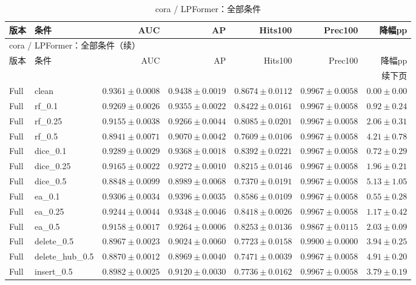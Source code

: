 \documentclass[UTF8,a4paper,11pt,fontset=fandol]{ctexart}
\begin{document}
{\footnotesize
\setlength{\tabcolsep}{3pt}
\begin{longtable}{llrrrrr}
\caption{cora / LPFormer：全部条件}\\
\toprule
版本 & 条件 & AUC & AP & Hits100 & Prec100 & 降幅pp \\
\midrule
\endfirsthead
\multicolumn{7}{l}{cora / LPFormer：全部条件（续）}\\
\toprule
版本 & 条件 & AUC & AP & Hits100 & Prec100 & 降幅pp \\
\midrule
\endhead
\midrule\multicolumn{7}{r}{续下页}\\
\endfoot
\bottomrule\endlastfoot
Full & clean & $0.9361\pm0.0008$ & $0.9438\pm0.0019$ & $0.8674\pm0.0112$ & $0.9967\pm0.0058$ & $0.00\pm0.00$ \\
Full & rf\_0.1 & $0.9269\pm0.0026$ & $0.9355\pm0.0022$ & $0.8422\pm0.0161$ & $0.9967\pm0.0058$ & $0.92\pm0.24$ \\
Full & rf\_0.25 & $0.9155\pm0.0038$ & $0.9266\pm0.0044$ & $0.8085\pm0.0201$ & $0.9967\pm0.0058$ & $2.06\pm0.31$ \\
Full & rf\_0.5 & $0.8941\pm0.0071$ & $0.9070\pm0.0042$ & $0.7609\pm0.0106$ & $0.9967\pm0.0058$ & $4.21\pm0.78$ \\
Full & dice\_0.1 & $0.9289\pm0.0029$ & $0.9368\pm0.0018$ & $0.8392\pm0.0221$ & $0.9967\pm0.0058$ & $0.72\pm0.29$ \\
Full & dice\_0.25 & $0.9165\pm0.0022$ & $0.9272\pm0.0010$ & $0.8215\pm0.0146$ & $0.9967\pm0.0058$ & $1.96\pm0.21$ \\
Full & dice\_0.5 & $0.8848\pm0.0099$ & $0.8989\pm0.0068$ & $0.7370\pm0.0191$ & $0.9967\pm0.0058$ & $5.13\pm1.05$ \\
Full & ea\_0.1 & $0.9306\pm0.0034$ & $0.9396\pm0.0035$ & $0.8586\pm0.0109$ & $0.9967\pm0.0058$ & $0.55\pm0.28$ \\
Full & ea\_0.25 & $0.9244\pm0.0044$ & $0.9348\pm0.0046$ & $0.8418\pm0.0026$ & $0.9967\pm0.0058$ & $1.17\pm0.42$ \\
Full & ea\_0.5 & $0.9158\pm0.0017$ & $0.9264\pm0.0006$ & $0.8253\pm0.0136$ & $0.9867\pm0.0115$ & $2.03\pm0.09$ \\
Full & delete\_0.5 & $0.8967\pm0.0023$ & $0.9024\pm0.0060$ & $0.7723\pm0.0158$ & $0.9900\pm0.0000$ & $3.94\pm0.25$ \\
Full & delete\_hub\_0.5 & $0.8870\pm0.0012$ & $0.8969\pm0.0040$ & $0.7471\pm0.0039$ & $0.9967\pm0.0058$ & $4.91\pm0.20$ \\
Full & insert\_0.5 & $0.8982\pm0.0025$ & $0.9120\pm0.0030$ & $0.7736\pm0.0162$ & $0.9967\pm0.0058$ & $3.79\pm0.19$ \\

\end{longtable}}
\end{document}
